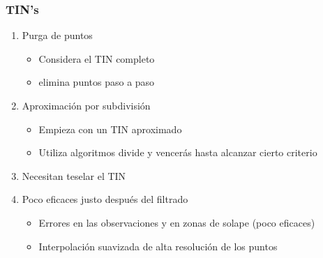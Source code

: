 \begin{frame}
  \frametitle{TIN's}
  \begin{enumerate}
    \item \alert{Purga de puntos}
      \begin{itemize}
        \item Considera el TIN completo 
        \item elimina puntos paso a paso
      \end{itemize}
    \item \alert{Aproximación por subdivisión}
      \begin{itemize}
        \item Empieza con un TIN aproximado
        \item Utiliza algoritmos \alert{divide y vencerás} hasta alcanzar cierto
          criterio
      \end{itemize}
    \item Necesitan teselar el TIN 
    \item Poco eficaces \alert{justo después} del filtrado
      \begin{itemize}
        \item Errores en las observaciones y en zonas de solape (poco eficaces)
        \item Interpolación suavizada de alta resolución de los puntos
      \end{itemize}
  \end{enumerate}
\end{frame}
